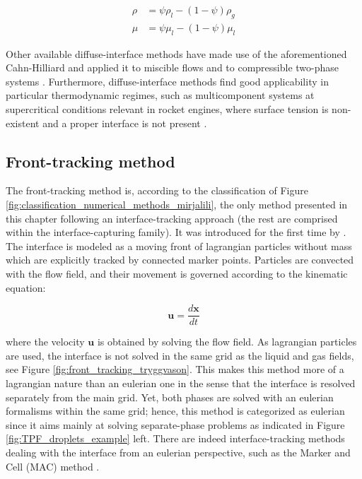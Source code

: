 \begin{subequations}
\begin{align}
\rho &= \psi \rho_l - \left( 1 -  \psi \right) \rho_g  \\
\mu &= \psi \mu_l   - \left( 1 -  \psi \right) \mu_l
\end{align}
\end{subequations}

Other available diffuse-interface methods have made use of the aforementioned Cahn-Hilliard and applied it to miscible flows  and to compressible two-phase systems . Furthermore, diffuse-interface methods find good applicability in particular thermodynamic regimes, such as multicomponent systems at supercritical conditions relevant in rocket engines, where surface tension is non-existent and a proper interface is not present . 




\subsection{Front-tracking method}

The front-tracking method is, according to the classification of Figure \ref{fig:classification_numerical_methods_mirjalili}, the only method presented in this chapter following an interface-tracking approach (the rest are comprised within the interface-capturing family). It was introduced for the first time by . The interface is modeled as a moving front of lagrangian particles without mass which are explicitly tracked by connected marker points. Particles are convected with the flow field, and their movement is governed according to the kinematic equation:

\begin{equation}
\textbf{u} = \frac{d \textbf{x}}{d t}
\end{equation}

where the velocity $\textbf{u}$ is obtained by solving the flow field. As lagrangian particles are used, the interface is not solved in the same grid as the liquid and gas fields, see Figure \ref{fig:front_tracking_tryggvason}. This makes this method more of a lagrangian nature than an eulerian one in the sense that the interface is resolved separately from the main grid. Yet, both phases are solved with an eulerian formalisms within the same grid; hence, this method is categorized as eulerian since it aims mainly at solving separate-phase problems as indicated in Figure \ref{fig:TPF_droplets_example} left. There are indeed interface-tracking methods dealing with the interface from an eulerian perspective, such as the Marker and Cell (MAC) method .

